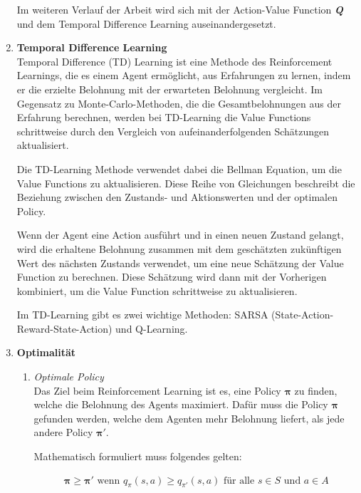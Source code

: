\begin{enumerate}
    Im weiteren Verlauf der Arbeit wird sich mit der Action-Value Function \textbf{\textit{Q}} und dem Temporal Difference Learning auseinandergesetzt.
    
    \item \textbf{Temporal Difference Learning}\\
    Temporal Difference (TD) Learning \cite{mediumTemporalDifference} ist eine Methode des Reinforcement Learnings, die es einem Agent ermöglicht, aus Erfahrungen zu lernen, indem er die erzielte Belohnung mit der erwarteten Belohnung vergleicht. Im Gegensatz zu Monte-Carlo-Methoden, die die Gesamtbelohnungen aus der Erfahrung berechnen, werden bei TD-Learning die Value Functions schrittweise durch den Vergleich von aufeinanderfolgenden Schätzungen aktualisiert.

    Die TD-Learning Methode verwendet dabei die Bellman Equation, um die Value Functions zu aktualisieren. Diese Reihe von Gleichungen beschreibt die Beziehung zwischen den Zustands- und Aktionswerten und der optimalen Policy.

    Wenn der Agent eine Action ausführt und in einen neuen Zustand gelangt, wird die erhaltene Belohnung zusammen mit dem geschätzten zukünftigen Wert des nächsten Zustands verwendet, um eine neue Schätzung der Value Function zu berechnen. Diese Schätzung wird dann mit der Vorherigen kombiniert, um die Value Function schrittweise zu aktualisieren.

    Im TD-Learning gibt es zwei wichtige Methoden: SARSA (State-Action-Reward-State-Action) und Q-Learning.

    \item \textbf{Optimalität}\\
    \begin{enumerate}
        \item \textit{Optimale Policy}\\
        Das Ziel beim Reinforcement Learning ist es, eine Policy {$\bm{\pi}$} zu finden, welche die Belohnung des Agents maximiert. Dafür muss die Policy {$\bm{\pi}$} gefunden werden, welche dem Agenten mehr Belohnung liefert, als jede andere Policy {$\bm{\pi'}$}.
        
        Mathematisch formuliert muss folgendes gelten:

        \begin{align}
            \bm{\pi} \geq \bm{\pi'}\text{ wenn } q_{\pi}(s,a) \geq  q_{\pi'}(s,a)\text{ für alle } s \in S \text{ und } a \in A
        \end{align}


\end{enumerate}
\end{enumerate}
